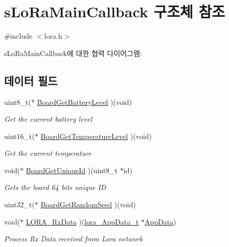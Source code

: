 \hypertarget{structs_lo_ra_main_callback}{}\section{s\+Lo\+Ra\+Main\+Callback 구조체 참조}
\label{structs_lo_ra_main_callback}


{\ttfamily \#include $<$lora.\+h$>$}



s\+Lo\+Ra\+Main\+Callback에 대한 협력 다이어그램\+:
\subsection*{데이터 필드}
\begin{DoxyCompactItemize}
\item 
uint8\+\_\+t($\ast$ \mbox{\hyperlink{structs_lo_ra_main_callback_ac4412349f783b6e7653afd9e3725f436}{Board\+Get\+Battery\+Level}} )(void)
\begin{DoxyCompactList}\small\item\em Get the current battery level \end{DoxyCompactList}\item 
uint16\+\_\+t($\ast$ \mbox{\hyperlink{structs_lo_ra_main_callback_a58bad07f3a00abe8a00ae1f25f6ab596}{Board\+Get\+Temperature\+Level}} )(void)
\begin{DoxyCompactList}\small\item\em Get the current temperature \end{DoxyCompactList}\item 
void($\ast$ \mbox{\hyperlink{structs_lo_ra_main_callback_a977e227d039bd23ba078f393a856fe3d}{Board\+Get\+Unique\+Id}} )(uint8\+\_\+t $\ast$id)
\begin{DoxyCompactList}\small\item\em Gets the board 64 bits unique ID \end{DoxyCompactList}\item 
uint32\+\_\+t($\ast$ \mbox{\hyperlink{structs_lo_ra_main_callback_a37eb88e46a53c5b95593370b046fd9c0}{Board\+Get\+Random\+Seed}} )(void)
\item 
void($\ast$ \mbox{\hyperlink{structs_lo_ra_main_callback_a22b1f2ac1a4f3880461e48becfc4530c}{L\+O\+R\+A\+\_\+\+Rx\+Data}} )(\mbox{\hyperlink{structlora___app_data__t}{lora\+\_\+\+App\+Data\+\_\+t}} $\ast$\mbox{\hyperlink{main_8c_a666c0952dd06ca69c3d85952b8c1c8d5}{App\+Data}})
\begin{DoxyCompactList}\small\item\em Process Rx Data received from Lora network \end{DoxyCompactList}\item 

\end{DoxyCompactItemize}
